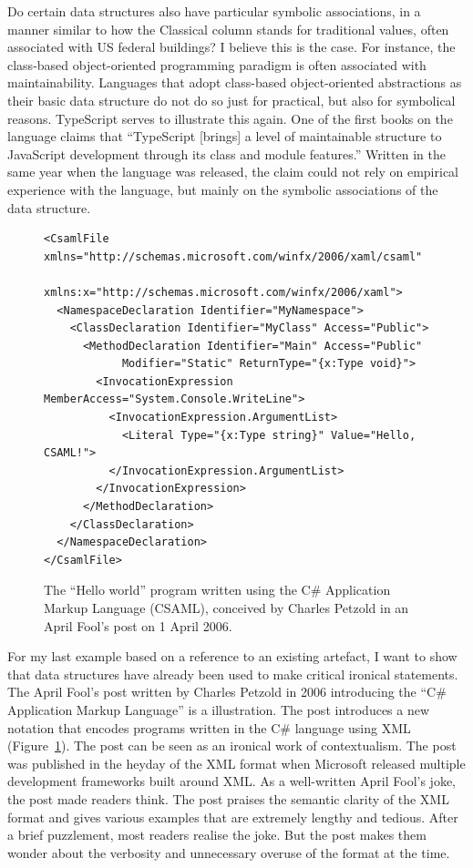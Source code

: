 Do certain data structures also have particular symbolic associations, in a manner similar
to how the Classical column stands for traditional values, often associated with US federal
buildings? I believe this is the case. For instance, the class-based object-oriented
programming paradigm is often associated with maintainability. Languages that adopt
class-based object-oriented abstractions as their basic data structure do not do so
just for practical, but also for symbolical reasons. TypeScript serves to illustrate this
again. One of the first books on the language claims that ``TypeScript [brings] a level of
maintainable structure to JavaScript development through its class and module
features.'' Written in the same year when
the language was released, the claim could not rely on empirical experience with the language,
but mainly on the symbolic associations of the data structure.

\begin{figure}
\begin{lstlisting}[language=csxml]
<CsamlFile xmlns="http://schemas.microsoft.com/winfx/2006/xaml/csaml"
      xmlns:x="http://schemas.microsoft.com/winfx/2006/xaml">
  <NamespaceDeclaration Identifier="MyNamespace">
    <ClassDeclaration Identifier="MyClass" Access="Public">
      <MethodDeclaration Identifier="Main" Access="Public"
            Modifier="Static" ReturnType="{x:Type void}">
        <InvocationExpression MemberAccess="System.Console.WriteLine">
          <InvocationExpression.ArgumentList>
            <Literal Type="{x:Type string}" Value="Hello, CSAML!">
          </InvocationExpression.ArgumentList>
        </InvocationExpression>
      </MethodDeclaration>
    </ClassDeclaration>
  </NamespaceDeclaration>
</CsamlFile>
\end{lstlisting}
\caption{The ``Hello world'' program written using the C\# Application Markup Language (CSAML),
conceived by Charles Petzold in an April Fool's post on 1 April 2006.}
\label{fig:csaml}
\end{figure}

For my last example based on a reference to an existing artefact, I want to show that
data structures have already been used to make critical ironical statements. The April Fool's
post written by Charles Petzold in 2006 introducing the ``C\# Application Markup Language''
is a illustration.
The post introduces a new notation that encodes programs written in the C\# language
using XML (Figure~\ref{fig:csaml}). The post can be seen as an ironical work of contextualism.
The post was published in the heyday of the XML format when Microsoft released multiple
development frameworks built around XML. As a well-written April Fool's joke, the post
made readers think. The post praises the semantic clarity of the XML format and gives
various examples that are extremely lengthy and tedious. After a brief puzzlement, most readers
realise the joke. But the post makes them wonder about the verbosity and unnecessary
overuse of the format at the time.

